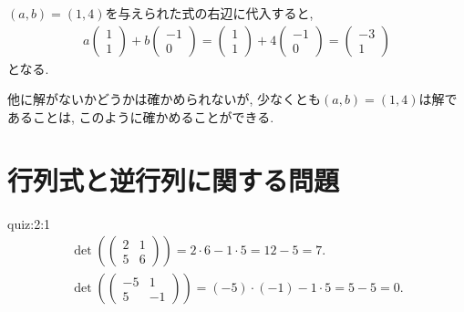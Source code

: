 \begin{checkanswer}%
  $(a,b)=(1,4)$を与えられた式の右辺に代入すると,
  \begin{align*}
    a\begin{pmatrix}
      1\\1
    \end{pmatrix}
    +b\begin{pmatrix}
      -1\\0
    \end{pmatrix}
    =
    \begin{pmatrix}
      1\\1
    \end{pmatrix}
    +4\begin{pmatrix}
      -1\\0
    \end{pmatrix}
    =
    \begin{pmatrix}
      -3\\1
    \end{pmatrix}
  \end{align*}
  となる.

  他に解がないかどうかは確かめられないが,
  少なくとも$(a,b)=(1,4)$は解であることは,
  このように確かめることができる.
\end{checkanswer}

\section{行列式と逆行列に関する問題}

\begin{answerof}{quiz:2:1}
  \begin{align*}
    \det(\begin{pmatrix}
      2&1\\5&6
    \end{pmatrix})=2\cdot 6 -1\cdot 5=12-5=7.
\\
    \det(\begin{pmatrix}
      -5&1\\5&-1
    \end{pmatrix})=(-5)\cdot(-1) -1\cdot 5=5-5=0.
\end{align*}
\end{answerof}


